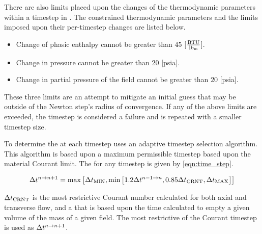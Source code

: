 There are also limits placed upon the changes of the thermodynamic parameters within a timestep in \cobra{}.
The constrained thermodynamic parameters and the limits imposed upon their per-timestep changes are listed below.

\begin{itemize}
\item{Change of phasic enthalpy cannot be greater than $45$ [$\frac{\text{BTU}}{\lbm{}}$].}
\item{Change in pressure cannot be greater than $20$ [psia].}
\item{Change in partial pressure of the \ncg{} field cannot be greater than $20$ [psia].}
\end{itemize}

These three limits are an attempt to mitigate an initial guess that may be outside of the Newton step's radius of convergence.
If any of the above limits are exceeded, the timestep is considered a failure and is repeated with a smaller timestep size.

To determine the \dt{} at each timestep \cobra{} uses an adaptive timestep selection algorithm.
This algorithm is based upon a maximum permissible timestep based upon the material Courant limit.
The \dt{} for any timestep is given by \eqref{eqn:time_step}.

\begin{equation}
\label{eqn:time_step}
\dt{}^{n \rightarrow n+1} = \max\left[ \dt{}_{\text{MIN}}, \min\left[1.2 \dt{}^{n-1 \rightarrow n}, 0.85 \dt{}_{\text{CRNT}}, \dt{}_{\text{MAX}} \right]\right]
\end{equation}

$\dt{}_{\text{CRNT}}$ is the most restrictive Courant number calculated for both axial and transverse flow, and a \dt{} that is based upon the time calculated to empty a given volume of the mass of a given field.
The most restrictive of the Courant timestep is used as $\dt{}^{n \rightarrow n+1}$.